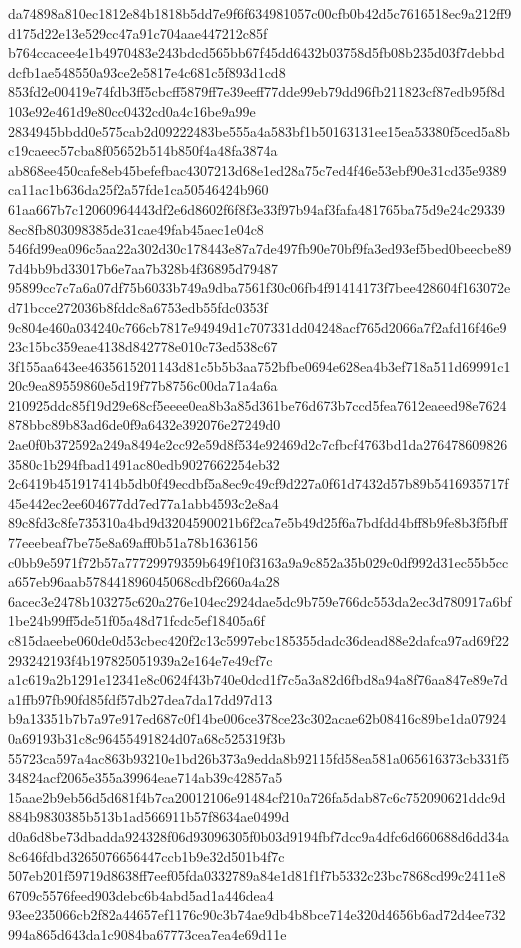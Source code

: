 \documentclass[11pt,a4paper]{article}
\begin{document}
{da74898a810ec1812e84b1818b5dd7e9f6f634981057c00cfb0b42d5c7616518ec9a212ff9d175d22e13e529cc47a91c704aae447212c85f
b764ccacee4e1b4970483e243bdcd565bb67f45dd6432b03758d5fb08b235d03f7debbddcfb1ae548550a93ce2e5817e4c681c5f893d1cd8
853fd2e00419e74fdb3ff5cbcff5879ff7e39eeff77dde99eb79dd96fb211823cf87edb95f8d103e92e461d9e80cc0432cd0a4c16be9a99e
2834945bbdd0e575cab2d09222483be555a4a583bf1b50163131ee15ea53380f5ced5a8bc19caeec57cba8f05652b514b850f4a48fa3874a
ab868ee450cafe8eb45befefbac4307213d68e1ed28a75c7ed4f46e53ebf90e31cd35e9389ca11ac1b636da25f2a57fde1ca50546424b960
61aa667b7c12060964443df2e6d8602f6f8f3e33f97b94af3fafa481765ba75d9e24c293398ec8fb803098385de31cae49fab45aec1e04c8
546fd99ea096c5aa22a302d30c178443e87a7de497fb90e70bf9fa3ed93ef5bed0beecbe897d4bb9bd33017b6e7aa7b328b4f36895d79487
95899cc7c7a6a07df75b6033b749a9dba7561f30c06fb4f91414173f7bee428604f163072ed71bcce272036b8fddc8a6753edb55fdc0353f
9c804e460a034240c766cb7817e94949d1c707331dd04248acf765d2066a7f2afd16f46e923c15bc359eae4138d842778e010c73ed538c67
3f155aa643ee4635615201143d81c5b5b3aa752bfbe0694e628ea4b3ef718a511d69991c120c9ea89559860e5d19f77b8756c00da71a4a6a
210925ddc85f19d29e68cf5eeee0ea8b3a85d361be76d673b7ccd5fea7612eaeed98e7624878bbc89b83ad6de0f9a6432e392076e27249d0
2ae0f0b372592a249a8494e2cc92e59d8f534e92469d2c7cfbcf4763bd1da2764786098263580c1b294fbad1491ac80edb9027662254eb32
2c6419b451917414b5db0f49ecdbf5a8ec9c49cf9d227a0f61d7432d57b89b5416935717f45e442ec2ee604677dd7ed77a1abb4593c2e8a4
89c8fd3c8fe735310a4bd9d3204590021b6f2ca7e5b49d25f6a7bdfdd4bff8b9fe8b3f5fbff77eeebeaf7be75e8a69aff0b51a78b1636156
c0bb9e5971f72b57a77729979359b649f10f3163a9a9c852a35b029c0df992d31ec55b5cca657eb96aab578441896045068cdbf2660a4a28
6acec3e2478b103275c620a276e104ec2924dae5dc9b759e766dc553da2ec3d780917a6bf1be24b99ff5de51f05a48d71fcdc5ef18405a6f
c815daeebe060de0d53cbec420f2c13c5997ebc185355dadc36dead88e2dafca97ad69f22293242193f4b197825051939a2e164e7e49cf7c
a1c619a2b1291e12341e8c0624f43b740e0dcd1f7c5a3a82d6fbd8a94a8f76aa847e89e7da1ffb97fb90fd85fdf57db27dea7da17dd97d13
b9a13351b7b7a97e917ed687c0f14be006ce378ce23c302acae62b08416c89be1da079240a69193b31c8c96455491824d07a68c525319f3b
55723ca597a4ac863b93210e1bd26b373a9edda8b92115fd58ea581a065616373cb331f534824acf2065e355a39964eae714ab39c42857a5
15aae2b9eb56d5d681f4b7ca20012106e91484cf210a726fa5dab87c6c752090621ddc9d884b9830385b513b1ad566911b57f8634ae0499d
d0a6d8be73dbadda924328f06d93096305f0b03d9194fbf7dcc9a4dfc6d660688d6dd34a8c646fdbd3265076656447ccb1b9e32d501b4f7c
507eb201f59719d8638ff7eef05fda0332789a84e1d81f1f7b5332c23bc7868cd99c2411e86709c5576feed903debc6b4abd5ad1a446dea4
93ee235066cb2f82a44657ef1176c90c3b74ae9db4b8bce714e320d4656b6ad72d4ee732994a865d643da1c9084ba67773cea7ea4e69d11e
}
\end{document}
